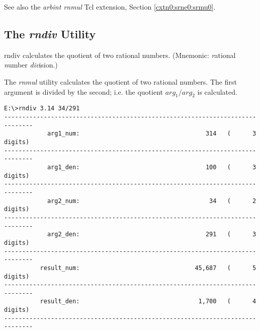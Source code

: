 \begin{dosutilcommandseealso}
See also the \emph{arbint rnmul} Tcl extension, 
Section \ref{cxtn0:srne0:srmu0}.
\end{dosutilcommandseealso}


\subsection{The \emph{rndiv} Utility}
\label{cdcm0:srnu0:srdv0}

\begin{dosutilcommandname}{rndiv}%
calculates the quotient of two rational numbers.
(Mnemonic:  \emph{r}ational
\emph{n}umber \emph{div}ision.)
\end{dosutilcommandname}

\begin{dosutilcommandsynopsis}
\end{dosutilcommandsynopsis}

\begin{dosutilcommanddescription}
The \emph{rnmul} utility calculates the quotient
of two rational numbers.  The first argument is divided
by the second; i.e. the quotient $arg_1 / arg_2$ is calculated.
\end{dosutilcommanddescription}

\begin{dosutilcommandsampleinvocations}
\begin{scriptsize}
\begin{verbatim}
E:\>rndiv 3.14 34/291
------------------------------------------------------------------------------
            arg1_num:                                   314   (      3 digits)
------------------------------------------------------------------------------
            arg1_den:                                   100   (      3 digits)
------------------------------------------------------------------------------
            arg2_num:                                    34   (      2 digits)
------------------------------------------------------------------------------
            arg2_den:                                   291   (      3 digits)
------------------------------------------------------------------------------
          result_num:                                45,687   (      5 digits)
------------------------------------------------------------------------------
          result_den:                                 1,700   (      4 digits)
------------------------------------------------------------------------------
\end{verbatim}
\end{scriptsize}
\end{dosutilcommandsampleinvocations}

